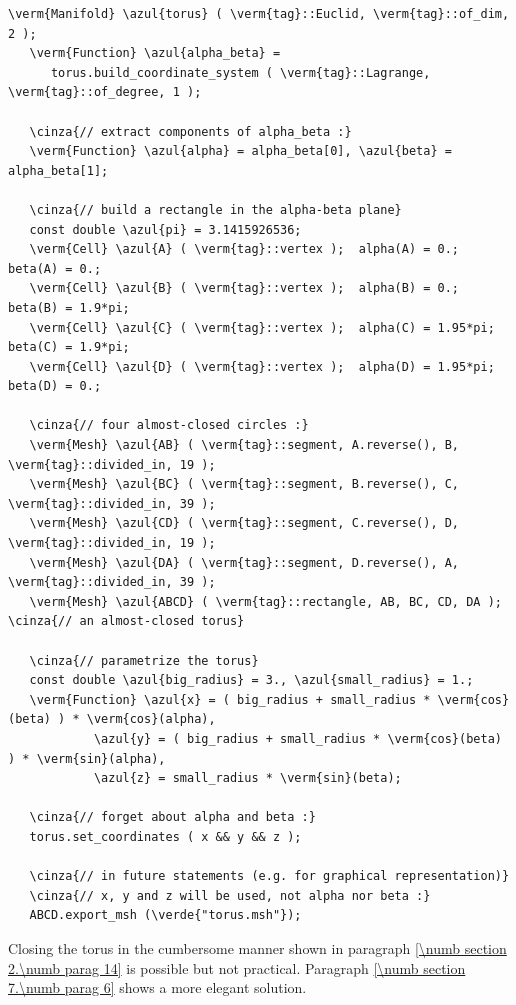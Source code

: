 \begin{Verbatim}[commandchars=\\\{\},formatcom=\small\tt,frame=single,
   label=main-\ref{\numb section 2.\numb parag 15}.cpp,rulecolor=\color{coment},
   baselinestretch=0.94,framesep=2mm]
   \verm{Manifold} \azul{torus} ( \verm{tag}::Euclid, \verm{tag}::of_dim, 2 );
   \verm{Function} \azul{alpha_beta} =
      torus.build_coordinate_system ( \verm{tag}::Lagrange, \verm{tag}::of_degree, 1 );

   \cinza{// extract components of alpha_beta :}
   \verm{Function} \azul{alpha} = alpha_beta[0], \azul{beta} = alpha_beta[1];

   \cinza{// build a rectangle in the alpha-beta plane}
   const double \azul{pi} = 3.1415926536;
   \verm{Cell} \azul{A} ( \verm{tag}::vertex );  alpha(A) = 0.;       beta(A) = 0.;
   \verm{Cell} \azul{B} ( \verm{tag}::vertex );  alpha(B) = 0.;       beta(B) = 1.9*pi;
   \verm{Cell} \azul{C} ( \verm{tag}::vertex );  alpha(C) = 1.95*pi;  beta(C) = 1.9*pi;
   \verm{Cell} \azul{D} ( \verm{tag}::vertex );  alpha(D) = 1.95*pi;  beta(D) = 0.;

   \cinza{// four almost-closed circles :}
   \verm{Mesh} \azul{AB} ( \verm{tag}::segment, A.reverse(), B, \verm{tag}::divided_in, 19 );
   \verm{Mesh} \azul{BC} ( \verm{tag}::segment, B.reverse(), C, \verm{tag}::divided_in, 39 );
   \verm{Mesh} \azul{CD} ( \verm{tag}::segment, C.reverse(), D, \verm{tag}::divided_in, 19 );
   \verm{Mesh} \azul{DA} ( \verm{tag}::segment, D.reverse(), A, \verm{tag}::divided_in, 39 );
   \verm{Mesh} \azul{ABCD} ( \verm{tag}::rectangle, AB, BC, CD, DA );  \cinza{// an almost-closed torus}
   
   \cinza{// parametrize the torus}
   const double \azul{big_radius} = 3., \azul{small_radius} = 1.;
   \verm{Function} \azul{x} = ( big_radius + small_radius * \verm{cos}(beta) ) * \verm{cos}(alpha),
            \azul{y} = ( big_radius + small_radius * \verm{cos}(beta) ) * \verm{sin}(alpha),
            \azul{z} = small_radius * \verm{sin}(beta);

   \cinza{// forget about alpha and beta :}
   torus.set_coordinates ( x && y && z );

   \cinza{// in future statements (e.g. for graphical representation)}
   \cinza{// x, y and z will be used, not alpha nor beta :}
   ABCD.export_msh (\verde{"torus.msh"});
\end{Verbatim}

Closing the torus in the cumbersome manner shown in paragraph
\ref{\numb section 2.\numb parag 14} is possible but not practical.
Paragraph \ref{\numb section 7.\numb parag 6} shows a more elegant solution.

